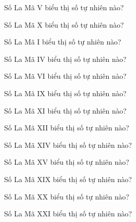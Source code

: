\begin{ex}
Số La Mã V biểu thị số tự nhiên nào?
\end{ex}

\begin{ex}
Số La Mã X biểu thị số tự nhiên nào?
\end{ex}

\begin{ex}
Số La Mã I biểu thị số tự nhiên nào?
\end{ex}

\begin{ex}
Số La Mã IV biểu thị số tự nhiên nào?
\end{ex}

\begin{ex}
Số La Mã VI biểu thị số tự nhiên nào?
\end{ex}

\begin{ex}
Số La Mã IX biểu thị số tự nhiên nào?
\end{ex}

\begin{ex}
Số La Mã XI biểu thị số tự nhiên nào?
\end{ex}

\begin{ex}
Số La Mã XII biểu thị số tự nhiên nào?
\end{ex}

\begin{ex}
Số La Mã XIV biểu thị số tự nhiên nào?
\end{ex}

\begin{ex}
Số La Mã XV biểu thị số tự nhiên nào?
\end{ex}

\begin{ex}
Số La Mã XIX biểu thị số tự nhiên nào?
\end{ex}

\begin{ex}
Số La Mã XX biểu thị số tự nhiên nào?
\end{ex}

\begin{ex}
Số La Mã XXI biểu thị số tự nhiên nào?
\end{ex}

